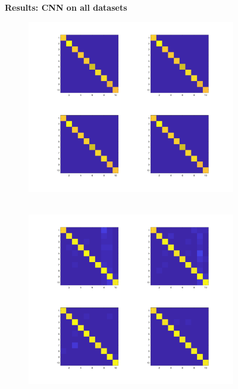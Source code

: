 \documentclass[letterpaper,12pt]{article}
\begin{document}
\begin{figure}[p]
\centering
\textbf{Results: CNN on all datasets\\}
\vspace{1em}
\begin{subfigure}{.3\textwidth}
  \centering
  \includegraphics[width=\linewidth]{CNN_MNIST}
  \caption{~}
\end{subfigure}%
\begin{subfigure}{.3\textwidth}
  \centering
  \includegraphics[width=\linewidth]{CNN_notMNIST}
  \caption{~}
\end{subfigure}

\end{figure}
\end{document}
